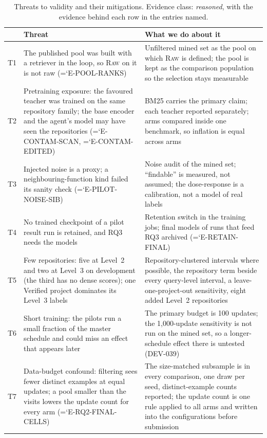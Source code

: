 \documentclass[10pt,twocolumn]{article}
\newcommand{\entry}[1]{{\ttfamily\hyphenchar\font=`\-\relax #1}}
\begin{document}
\begin{table}[t]
\centering\small
\caption{Threats to validity and their mitigations. Evidence class: \emph{reasoned}, with the
evidence behind each row in the entries named.}
\label{tab:threats}
\begin{tabular}{@{}p{}p{}p{}@{}}
\toprule
& Threat & What we do about it \\
\midrule
T1 & The published pool was built with a retriever in the loop, so \textsc{Raw} on it is not raw
(\entry{E-POOL-RANKS}) & Unfiltered mined set as the pool on which \textsc{Raw} is defined; the pool is kept as the
comparison population so the selection stays measurable \\
T2 & Pretraining exposure: the favoured teacher was trained on the same repository family; the base
encoder and the agent's model may have seen the repositories (\entry{E-CONTAM-SCAN}, \entry{E-CONTAM-EDITED}) &
BM25 carries the primary claim; each teacher reported separately; arms compared inside one benchmark, so inflation is equal across arms \\
T3 & Injected noise is a proxy; a neighbouring-function kind failed its sanity check
(\entry{E-PILOT-NOISE-SIB}) & Noise audit of the mined set; ``findable'' is measured, not assumed; the dose-response is a calibration, not a model of real labels \\
T4 & No trained checkpoint of a pilot result run is retained, and RQ3 needs the models & Retention switch in
the training jobs; final models of runs that feed RQ3 archived (\entry{E-RETAIN-FINAL}) \\
T5 & Few repositories: five at Level~2 and two at Level~3 on development (the third has no dense scores); one Verified project dominates its Level~3 labels & Repository-clustered intervals
where possible, the repository term beside every query-level interval, a leave-one-project-out sensitivity, eight added Level~2 repositories \\
T6 & Short training: the pilots run a small fraction of the master schedule and could miss an effect that appears later & The primary budget is 100 updates; the 1,000-update sensitivity is not run on the mined set, so a longer-schedule effect there is untested (DEV-039) \\
T7 & Data-budget confound: filtering sees fewer distinct examples at equal updates; a pool smaller than the visits lowers the update count for every arm (\entry{E-RQ2-FINAL-CELLS}) & The size-matched subsample is in every comparison, one draw per seed, distinct-example counts reported; the update count is one rule applied to all arms and written into the configurations before submission \\

\end{tabular}
\end{table}
\end{document}
